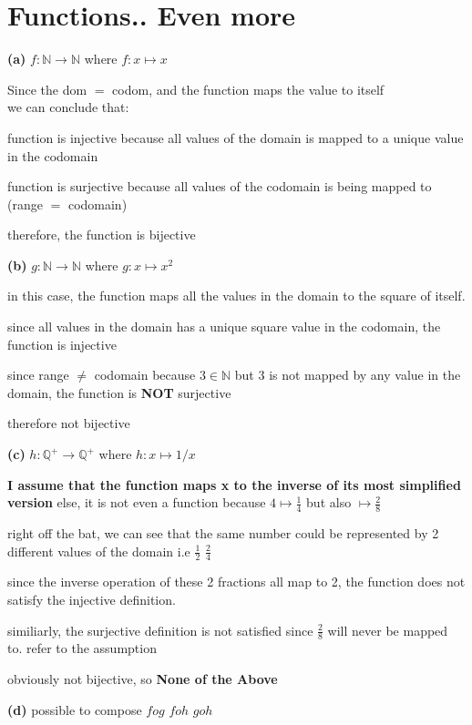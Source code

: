 \documentclass[12pts,A4]{article}
\begin{document}
\section{ Functions.. Even more}

\begin{flushleft}
    \textbf{(a)} $f: \mathbb{N} \rightarrow \mathbb{N}$ where $ f: x \mapsto x$
    
    \bigskip 

    Since the dom $=$ codom, and the function maps the value to itself\\
    we can conclude that:
    
    \bigskip
    
    function is injective because all values of the domain is mapped to a unique value in the codomain 
    
    function is surjective because all values of the codomain is being mapped to
    (range $=$ codomain)

    therefore, the function is bijective

    \bigskip



    \textbf{(b)} $g: \mathbb{N} \rightarrow \mathbb{N}$ where $ g: x \mapsto x^{2}$

    in this case, the function maps all the values in the domain to the square of itself.

    since all values in the domain has a unique square value in the codomain, the function is injective

    since range $\not =$ codomain because $ 3 \in \mathbb{N}$ but 3 is not mapped by any value in the domain, the function is \textbf{NOT} surjective

    therefore not bijective 

    \bigskip

    \textbf{(c)} $h: \mathbb{Q^{+}} \rightarrow \mathbb{Q^{+}}$ where $ h: x \mapsto 1/x$
    
    \textbf{ I assume that the function maps x to the inverse of its most simplified version} else, it is not even a function 
    because $ 4 \mapsto \frac{1}{4}$ but also $\mapsto \frac{2}{8}$
    
    right off the bat, we can see that the same number could be represented by 2 different values of the domain i.e $ \frac{1}{2}$ $\frac{2}{4} $

    since the inverse operation of these 2 fractions all map to 2, the function does not satisfy the injective definition.

    similiarly, the surjective definition is not satisfied since $\frac{2}{8}$ will never be mapped to. refer to the assumption

    obviously not bijective, so \textbf{None of the Above}

\bigskip

    \textbf{(d)} possible to compose $ f o g$ $ f o h$ $ g o h$ 
     
\end{flushleft}
\end{document}
